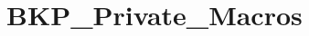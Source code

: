 \hypertarget{group___b_k_p___private___macros}{}\section{B\+K\+P\+\_\+\+Private\+\_\+\+Macros}
\label{group___b_k_p___private___macros}
